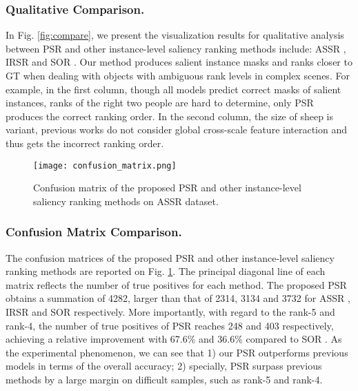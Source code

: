 \documentclass[sigconf]{acmart}
\newcommand{\figref}[1]{Fig. \ref{#1}}
\begin{document}
\subsubsection{Qualitative Comparison.} 
In \figref{fig:compare}, we present the visualization results for qualitative analysis between PSR and other instance-level saliency ranking methods include: ASSR \cite{siris2020inferring}, IRSR \cite{liu2021instance} and SOR \cite{fang2021salient}. Our method produces salient instance masks and ranks closer to GT when dealing with objects with ambiguous rank levels in complex scenes. For example, in the first column, though all models predict correct masks of salient instances, ranks of the right two people are hard to determine, only PSR produces the correct ranking order. In the second column, the size of sheep is variant, previous works do not consider global cross-scale feature interaction and thus gets the incorrect ranking order.

 \begin{figure}
	\begin{center}
		\texttt{[image: confusion\_matrix.png]}
		\caption{Confusion matrix of the proposed PSR and other instance-level saliency ranking methods on ASSR dataset.
		}\label{fig:confusion}
	\end{center}
\end{figure}
\subsubsection{Confusion Matrix Comparison.}
The confusion matrices of the proposed PSR and other instance-level saliency ranking methods \cite{siris2020inferring,liu2021instance,fang2021salient} are reported on Fig. \ref{fig:confusion}. The principal diagonal line of each matrix reflects the number of true positives for each method. The proposed PSR obtains a summation of 4282, larger than that of 2314, 3134 and 3732 for ASSR \cite{siris2020inferring}, IRSR \cite{liu2021instance} and SOR \cite{fang2021salient} respectively. More importantly, with regard to the rank-5 and rank-4, the number of true positives of PSR reaches 248 and 403 respectively, achieving a relative improvement with 67.6\% and 36.6\% compared to SOR \cite{fang2021salient}.  As the experimental phenomenon, we can see that 1) our PSR outperforms previous models in terms of the overall accuracy; 2) specially, PSR surpass previous methods by a large margin on difficult samples, such as rank-5 and rank-4.
\end{document}
